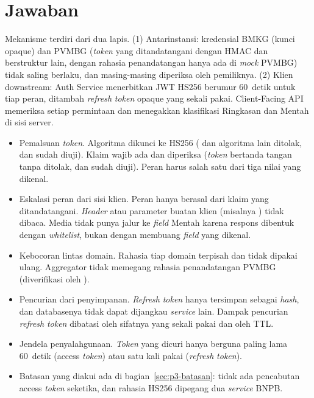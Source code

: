 \section{Jawaban}

\begin{jawaban}
Mekanisme terdiri dari dua lapis. (1) Antarinstansi: kredensial BMKG (kunci opaque) dan PVMBG (\emph{token} yang
ditandatangani dengan HMAC dan berstruktur lain, dengan rahasia penandatangan hanya ada di \emph{mock} PVMBG) tidak saling
berlaku, dan masing-masing diperiksa oleh pemiliknya. (2) Klien downstream: Auth Service menerbitkan JWT HS256
berumur 60~detik untuk tiap peran, ditambah \emph{refresh} \emph{token} opaque yang sekali pakai. Client-Facing API memeriksa setiap
permintaan dan menegakkan klasifikasi Ringkasan dan Mentah di sisi server.
\end{jawaban}

\begin{jawaban}
\begin{itemize}
 \item Pemalsuan \emph{token}. Algoritma dikunci ke HS256 ( dan algoritma lain ditolak, dan sudah diuji). Klaim  wajib ada dan diperiksa (\emph{token} bertanda tangan tanpa  ditolak, dan sudah diuji). Peran harus salah satu dari tiga nilai yang dikenal.
 \item Eskalasi peran dari sisi klien. Peran hanya berasal dari klaim yang ditandatangani. \emph{Header} atau parameter buatan klien (misalnya ) tidak dibaca. Media tidak punya jalur ke \emph{field} Mentah karena respons dibentuk dengan \emph{whitelist}, bukan dengan membuang \emph{field} yang dikenal.
 \item Kebocoran lintas domain. Rahasia tiap domain terpisah dan tidak dipakai ulang. Aggregator tidak memegang rahasia penandatangan PVMBG (diverifikasi oleh ).
 \item Pencurian dari penyimpanan. \emph{Refresh} \emph{token} hanya tersimpan sebagai \emph{hash}, dan databasenya tidak dapat dijangkau \emph{service} lain. Dampak pencurian \emph{refresh} \emph{token} dibatasi oleh sifatnya yang sekali pakai dan oleh TTL.
 \item Jendela penyalahgunaan. \emph{Token} yang dicuri hanya berguna paling lama 60~detik (access \emph{token}) atau satu kali pakai (\emph{refresh} \emph{token}).
 \item Batasan yang diakui ada di bagian~\ref{sec:p3-batasan}: tidak ada pencabutan access \emph{token} seketika, dan rahasia HS256 dipegang dua \emph{service} BNPB.
\end{itemize}
\end{jawaban}
